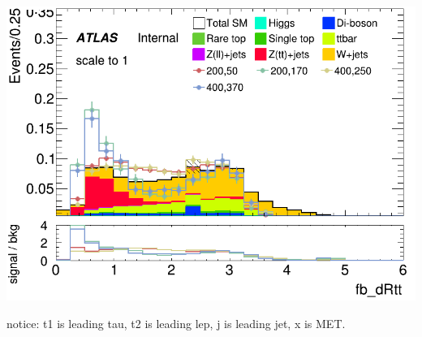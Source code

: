 \documentclass[usenames,dvipsnames]{beamer}
\begin{document}
\begin{frame}
\begin{minipage}{0.32\textwidth}
        \includegraphics[width=\textwidth]{graphics/LH_met_sig/LH_fb_dRtt_norm.png}
    \end{minipage}
    notice: t1 is leading tau, t2 is leading lep, j is leading jet, x is MET.
\end{frame}
\end{document}

